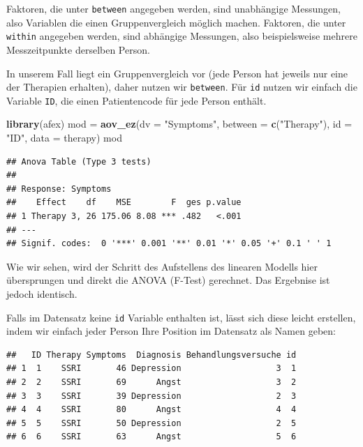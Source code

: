 \documentclass[
]{book}
\newenvironment{Shaded}{\begin{snugshade}}{\end{snugshade}}
\newcommand{\AttributeTok}[1]{\textcolor[rgb]{0.13,0.29,0.53}{#1}}
\newcommand{\FunctionTok}[1]{\textcolor[rgb]{0.13,0.29,0.53}{\textbf{#1}}}
\newcommand{\NormalTok}[1]{#1}
\newcommand{\OtherTok}[1]{\textcolor[rgb]{0.56,0.35,0.01}{#1}}
\newcommand{\SpecialCharTok}[1]{\textcolor[rgb]{0.81,0.36,0.00}{\textbf{#1}}}
\newcommand{\StringTok}[1]{\textcolor[rgb]{0.31,0.60,0.02}{#1}}
\begin{document}
Faktoren, die unter \texttt{between} angegeben werden, sind unabhängige Messungen, also Variablen die einen Gruppenvergleich möglich machen. Faktoren, die unter \texttt{within} angegeben werden, sind abhängige Messungen, also beispielsweise mehrere Messzeitpunkte derselben Person.

In unserem Fall liegt ein Gruppenvergleich vor (jede Person hat jeweils nur eine der Therapien erhalten), daher nutzen wir \texttt{between}. Für \texttt{id} nutzen wir einfach die Variable \texttt{ID}, die einen Patientencode für jede Person enthält.

\begin{Shaded}
\begin{Highlighting}[]
\FunctionTok{library}\NormalTok{(afex)}
\NormalTok{mod }\OtherTok{=} \FunctionTok{aov\_ez}\NormalTok{(}\AttributeTok{dv =} \StringTok{"Symptoms"}\NormalTok{, }\AttributeTok{between =} \FunctionTok{c}\NormalTok{(}\StringTok{"Therapy"}\NormalTok{), }\AttributeTok{id =} \StringTok{"ID"}\NormalTok{, }\AttributeTok{data =}\NormalTok{ therapy)}
\NormalTok{mod}
\end{Highlighting}
\end{Shaded}

\begin{verbatim}
## Anova Table (Type 3 tests)
## 
## Response: Symptoms
##    Effect    df    MSE        F  ges p.value
## 1 Therapy 3, 26 175.06 8.08 *** .482   <.001
## ---
## Signif. codes:  0 '***' 0.001 '**' 0.01 '*' 0.05 '+' 0.1 ' ' 1
\end{verbatim}

Wie wir sehen, wird der Schritt des Aufstellens des linearen Modells hier übersprungen und direkt die ANOVA (F-Test) gerechnet.
Das Ergebnise ist jedoch identisch.

Falls im Datensatz keine \texttt{id} Variable enthalten ist, lässt sich diese leicht erstellen, indem wir einfach jeder Person Ihre Position im Datensatz als Namen geben:

\begin{Shaded}
\end{Shaded}

\begin{verbatim}
##   ID Therapy Symptoms  Diagnosis Behandlungsversuche id
## 1  1    SSRI       46 Depression                   3  1
## 2  2    SSRI       69      Angst                   3  2
## 3  3    SSRI       39 Depression                   2  3
## 4  4    SSRI       80      Angst                   4  4
## 5  5    SSRI       50 Depression                   2  5
## 6  6    SSRI       63      Angst                   5  6
\end{verbatim}
\end{document}
